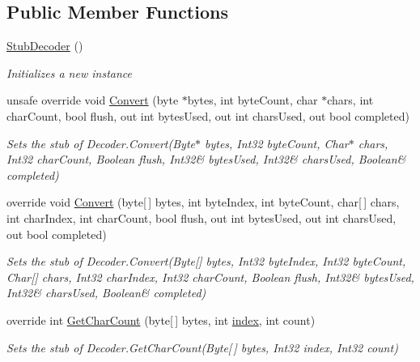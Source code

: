\subsection*{Public Member Functions}
\begin{DoxyCompactItemize}
\item 
\hyperlink{class_system_1_1_text_1_1_fakes_1_1_stub_decoder_a18b94eb274c7d1643c84b2f689b80ca9}{Stub\-Decoder} ()
\begin{DoxyCompactList}\small\item\em Initializes a new instance\end{DoxyCompactList}\item 
unsafe override void \hyperlink{class_system_1_1_text_1_1_fakes_1_1_stub_decoder_a456e2d9c0f4a4fb3f54201fc3940ea82}{Convert} (byte $\ast$bytes, int byte\-Count, char $\ast$chars, int char\-Count, bool flush, out int bytes\-Used, out int chars\-Used, out bool completed)
\begin{DoxyCompactList}\small\item\em Sets the stub of Decoder.\-Convert(Byte$\ast$ bytes, Int32 byte\-Count, Char$\ast$ chars, Int32 char\-Count, Boolean flush, Int32\& bytes\-Used, Int32\& chars\-Used, Boolean\& completed)\end{DoxyCompactList}\item 
override void \hyperlink{class_system_1_1_text_1_1_fakes_1_1_stub_decoder_a5d8c6de24f626dc1a62606ed7443443a}{Convert} (byte\mbox{[}$\,$\mbox{]} bytes, int byte\-Index, int byte\-Count, char\mbox{[}$\,$\mbox{]} chars, int char\-Index, int char\-Count, bool flush, out int bytes\-Used, out int chars\-Used, out bool completed)
\begin{DoxyCompactList}\small\item\em Sets the stub of Decoder.\-Convert(Byte\mbox{[}\mbox{]} bytes, Int32 byte\-Index, Int32 byte\-Count, Char\mbox{[}\mbox{]} chars, Int32 char\-Index, Int32 char\-Count, Boolean flush, Int32\& bytes\-Used, Int32\& chars\-Used, Boolean\& completed)\end{DoxyCompactList}\item 
override int \hyperlink{class_system_1_1_text_1_1_fakes_1_1_stub_decoder_af98f0dd9e07d398b343f03e442e57c32}{Get\-Char\-Count} (byte\mbox{[}$\,$\mbox{]} bytes, int \hyperlink{jquery-1_810_82-vsdoc_8js_a75bb12d1f23302a9eea93a6d89d0193e}{index}, int count)
\begin{DoxyCompactList}\small\item\em Sets the stub of Decoder.\-Get\-Char\-Count(\-Byte\mbox{[}$\,$\mbox{]} bytes, Int32 index, Int32 count)\end{DoxyCompactList}\item 

\end{DoxyCompactItemize}
